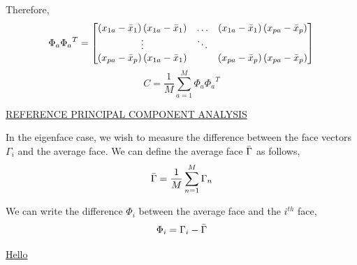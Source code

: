 \documentclass[12pt]{report}
\begin{document}
\begin{myproof}
                Therefore,
                    \[
                        \Phi_a {\Phi_a}^T = \begin{bmatrix}
                            \left(x_{1a} - \bar{x}_1\right)\left(x_{1a} - \bar{x}_1\right) & \dotsc & \left(x_{1a} - \bar{x}_1\right) \left(x_{pa} - \bar{x}_p\right) \\
                            \vdots & \ddots & \\
                            \left(x_{pa} - \bar{x}_p\right) \left(x_{1a} - \bar{x}_1\right) & & \left(x_{pa} - \bar{x}_p\right) \left(x_{pa} - \bar{x}_p\right)
                        \end{bmatrix}
                    \]
                    \[
                        C = \frac{1}{M} \sum_{a=1}^M \Phi_a {\Phi_a}^T
                    \]
            \end{myproof}

            \href{https://builtin.com/data-science/step-step-explanation-principal-component-analysis}{REFERENCE PRINCIPAL COMPONENT ANALYSIS} 

            In the eigenface case, we wish to measure the difference between the face vectors $\Gamma_i$ and the average face. We can define the average face $\bar{\Gamma}$ as follows,
                \[
                    \bar{\Gamma} = \frac{1}{M} \sum_{n=1}^M \Gamma_n
                \]

            We can write the difference $\Phi_i$ between the average face and the $i^{th}$ face,
                \[
                    \Phi_i = \Gamma_i - \bar{\Gamma}
                \]
            
            \href{https://nzmaths.co.nz/category/glossary/variance-discrete-random-variable\#:\textasciitilde:text=A\%20measure\%20of\%20spread\%20for,2\%20or\%20\%CF\%832x.}{Hello}

\end{document}
